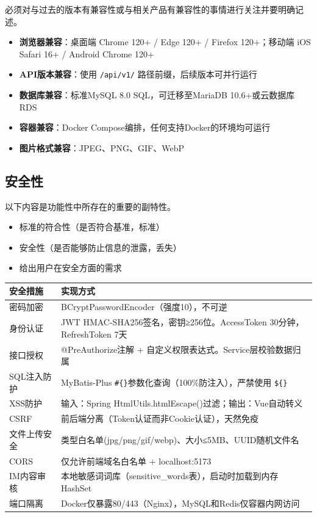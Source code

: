 \documentclass[12pt,a4paper]{ctexart}
\numberwithin{figure}{section}
\numberwithin{table}{section}
\begin{document}
必须对与过去的版本有兼容性或与相关产品有兼容性的事情进行关注并要明确记述。

\begin{itemize}
    \item \textbf{浏览器兼容}：桌面端 Chrome 120+ / Edge 120+ / Firefox 120+；移动端 iOS Safari 16+ / Android Chrome 120+
    \item \textbf{API版本兼容}：使用 \verb|/api/v1/| 路径前缀，后续版本可并行运行
    \item \textbf{数据库兼容}：标准MySQL 8.0 SQL，可迁移至MariaDB 10.6+或云数据库RDS
    \item \textbf{容器兼容}：Docker Compose编排，任何支持Docker的环境均可运行
    \item \textbf{图片格式兼容}：JPEG、PNG、GIF、WebP
\end{itemize}

\subsection{安全性}

以下内容是功能性中所存在的重要的副特性。

\begin{itemize}
    \item 标准的符合性（是否符合基准，标准）
    \item 安全性（是否能够防止信息的泄露，丢失）
    \item 给出用户在安全方面的需求
\end{itemize}

\begin{center}
\renewcommand{\arraystretch}{1.3}
\begin{tabular}{|p{4cm}|p{10cm}|}
\hline
\rowcolor{tableheader}
\textbf{安全措施} & \textbf{实现方式} \\
\hline
密码加密 & BCryptPasswordEncoder（强度10），不可逆 \\
\hline
身份认证 & JWT HMAC-SHA256签名，密钥≥256位。AccessToken 30分钟，RefreshToken 7天 \\
\hline
接口授权 & @PreAuthorize注解 + 自定义权限表达式。Service层校验数据归属 \\
\hline
SQL注入防护 & MyBatis-Plus \verb|#{}|参数化查询（100\%防注入），严禁使用 \verb|${}| \\
\hline
XSS防护 & 输入：Spring HtmlUtils.htmlEscape()过滤；输出：Vue自动转义 \\
\hline
CSRF & 前后端分离（Token认证而非Cookie认证），天然免疫 \\
\hline
文件上传安全 & 类型白名单(jpg/png/gif/webp)、大小≤5MB、UUID随机文件名 \\
\hline
CORS & 仅允许前端域名白名单 + localhost:5173 \\
\hline
IM内容审核 & 本地敏感词词库（sensitive\_words表），启动时加载到内存HashSet \\
\hline
端口隔离 & Docker仅暴露80/443（Nginx），MySQL和Redis仅容器内网访问 \\
\hline
\end{tabular}
\end{center}
\end{document}
